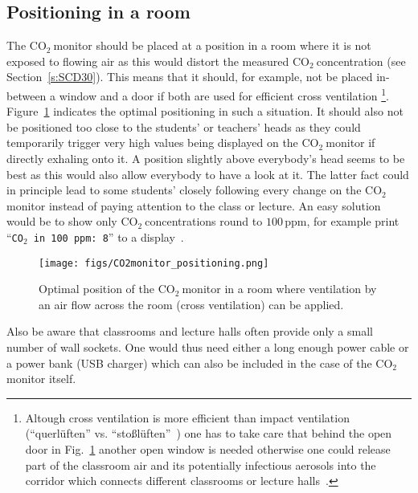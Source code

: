 \documentclass[12pt,a4paper]{article}
\newcommand{\coo}{\ensuremath{\mathrm{CO_2}~}}
\begin{document}
\subsection{Positioning in a room}
The \coo monitor should be placed at a position in a room where it is not exposed to flowing air as this would distort the measured \coo concentration (see Section~\ref{s:SCD30}). This means that it should, for example, not be placed in-between a window and a door if both are used for efficient cross ventilation%
\footnote{Altough cross ventilation is more efficient than impact ventilation (``querlüften'' vs. ``stoßlüften''~\cite{GUARDIAN2020}) one has to take care that behind the open door in Fig.~\ref{f:CO2_monitor_positioning} another open window is needed otherwise one could release part of the classroom air and its potentially infectious aerosols into the corridor which connects different classrooms or lecture halls~\cite{STAHMER2020}.}. 
Figure~\ref{f:CO2_monitor_positioning} indicates the optimal positioning in such a situation. It should also not be positioned too close to the students' or teachers' heads as they could temporarily trigger very high values being displayed on the \coo monitor if directly exhaling onto it. A position slightly above everybody's head seems to be best as this would also allow everybody to have a look at it. The latter fact could in principle lead to some students' closely following every change on the \coo monitor instead of paying attention to the class or lecture. An easy solution would be to show only \coo concentrations round to $100\,\mathrm{ppm}$, for example print 
``\texttt{CO$_2$ in 100 ppm: 8}'' to a display~\cite{STAHMER2020}.
\begin{figure}[tb]
\centering
\texttt{[image: figs/CO2monitor\_positioning.png]}
\caption{Optimal position of the \coo monitor in a room where ventilation by an air flow across the room (cross ventilation) can be applied.}
\label{f:CO2_monitor_positioning}
\end{figure}

Also be aware that classrooms and lecture halls often provide only a small number of wall sockets. One would thus need either a long enough power cable or a power bank (USB charger) which can also be included in the case of the \coo monitor itself.


\end{document}
